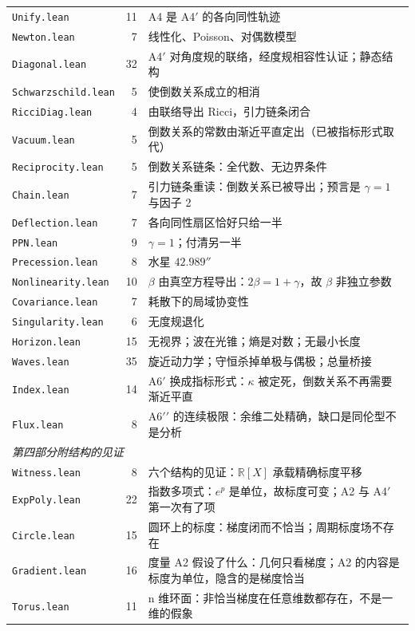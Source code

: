 \documentclass[11pt,a4paper]{article}
\theoremstyle{sudef}
\begin{document}
\begin{center}
\begin{longtable}{lrl}
\texttt{Unify.lean} & 11 & A4 是 A4$'$ 的各向同性轨迹 \\
\texttt{Newton.lean} & 7 & 线性化、Poisson、对偶数模型 \\
\texttt{Diagonal.lean} & 32 & A4$'$ 对角度规的联络，经度规相容性认证；静态结构 \\
\texttt{Schwarzschild.lean} & 5 & 使倒数关系成立的相消 \\
\texttt{RicciDiag.lean} & 4 & 由联络导出 Ricci，引力链条闭合 \\
\texttt{Vacuum.lean} & 5 & 倒数关系的常数由渐近平直定出（已被指标形式取代） \\
\texttt{Reciprocity.lean} & 5 & 倒数关系链条：全代数、无边界条件 \\
\texttt{Chain.lean} & 7 & 引力链条重读：倒数关系已被导出；预言是 $\gamma=1$ 与因子 2 \\
\texttt{Deflection.lean} & 7 & 各向同性扇区恰好只给一半 \\
\texttt{PPN.lean} & 9 & $\gamma=1$；付清另一半 \\
\texttt{Precession.lean} & 8 & 水星 $42.989''$ \\
\texttt{Nonlinearity.lean} & 10 & $\beta$ 由真空方程导出：$2\beta=1+\gamma$，故 $\beta$ 非独立参数 \\
\texttt{Covariance.lean} & 7 & 耗散下的局域协变性 \\
\texttt{Singularity.lean} & 6 & 无度规退化 \\
\texttt{Horizon.lean} & 15 & 无视界；波在光锥；熵是对数；无最小长度 \\
\texttt{Waves.lean} & 35 & 旋近动力学；守恒杀掉单极与偶极；总量桥接 \\
\texttt{Index.lean} & 14 & A6$'$ 换成指标形式：$\kappa$ 被定死，倒数关系不再需要渐近平直 \\
\texttt{Flux.lean} & 8 & A6$\prime\prime$ 的连续极限：余维二处精确，缺口是同伦型不是分析 \\
\midrule
\multicolumn{3}{l}{\emph{第四部分附\quad 结构的见证}}\\
\texttt{Witness.lean} & 8 & 六个结构的见证：$\mathbb R[X]$ 承载精确标度平移 \\
\texttt{ExpPoly.lean} & 22 & 指数多项式：$e^p$ 是单位，故标度可变；A2 与 A4$'$ 第一次有了项 \\
\texttt{Circle.lean} & 15 & 圆环上的标度：梯度闭而不恰当；周期标度场不存在 \\
\texttt{Gradient.lean} & 16 & 度量 A2 假设了什么：几何只看梯度；A2 的内容是标度为单位，隐含的是梯度恰当 \\
\texttt{Torus.lean} & 11 & n 维环面：非恰当梯度在任意维数都存在，不是一维的假象 \\

\end{longtable}
\end{center}
\end{document}
